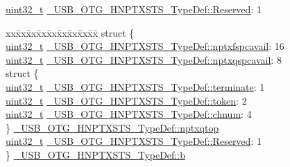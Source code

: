 \begin{DoxyCompactItemize}
\begin{tabbing}
\end{tabbing}\item 
\hyperlink{stdint_8h_a435d1572bf3f880d55459d9805097f62}{uint32\-\_\-t} \hyperlink{group___u_s_b___o_t_g___d_r_i_v_e_r_ga0b02a3404c6ad41176f49181c017ca7c}{\-\_\-\-U\-S\-B\-\_\-\-O\-T\-G\-\_\-\-H\-N\-P\-T\-X\-S\-T\-S\-\_\-\-Type\-Def\-::\-Reserved}\-: 1
\item 
\begin{tabbing}
xx\=xx\=xx\=xx\=xx\=xx\=xx\=xx\=xx\=\kill
struct \{\\
\>\hyperlink{stdint_8h_a435d1572bf3f880d55459d9805097f62}{uint32\_t} \hyperlink{group___u_s_b___o_t_g___d_r_i_v_e_r_gac775d30f4d6ea8497522eea1c8f1dd99}{\_USB\_OTG\_HNPTXSTS\_TypeDef::nptxfspcavail}: 16\\
\>\hyperlink{stdint_8h_a435d1572bf3f880d55459d9805097f62}{uint32\_t} \hyperlink{group___u_s_b___o_t_g___d_r_i_v_e_r_gac7c8e3ec8eb043384cd26aaf67009f46}{\_USB\_OTG\_HNPTXSTS\_TypeDef::nptxqspcavail}: 8\\
\>struct \{\\
\>\>\hyperlink{stdint_8h_a435d1572bf3f880d55459d9805097f62}{uint32\_t} \hyperlink{group___u_s_b___o_t_g___d_r_i_v_e_r_ga15d8c9921780fc2eabe7052d5aa94ca1}{\_USB\_OTG\_HNPTXSTS\_TypeDef::terminate}: 1\\
\>\>\hyperlink{stdint_8h_a435d1572bf3f880d55459d9805097f62}{uint32\_t} \hyperlink{group___u_s_b___o_t_g___d_r_i_v_e_r_gae107b5535ca75e09689f2e18a7f0a7d9}{\_USB\_OTG\_HNPTXSTS\_TypeDef::token}: 2\\
\>\>\hyperlink{stdint_8h_a435d1572bf3f880d55459d9805097f62}{uint32\_t} \hyperlink{group___u_s_b___o_t_g___d_r_i_v_e_r_gaa358189a93a955a21e5b3cfdb0b1a08d}{\_USB\_OTG\_HNPTXSTS\_TypeDef::chnum}: 4\\
\>\} \hyperlink{group___u_s_b___o_t_g___d_r_i_v_e_r_gac60267dff234320797a8a09809cc7b43}{\_USB\_OTG\_HNPTXSTS\_TypeDef::nptxqtop}\\
\>\hyperlink{stdint_8h_a435d1572bf3f880d55459d9805097f62}{uint32\_t} \hyperlink{group___u_s_b___o_t_g___d_r_i_v_e_r_ga0b02a3404c6ad41176f49181c017ca7c}{\_USB\_OTG\_HNPTXSTS\_TypeDef::Reserved}: 1\\
\} \hyperlink{group___u_s_b___o_t_g___d_r_i_v_e_r_ga93b03184bf8fd8e9db0d50ef51e02aa3}{\_USB\_OTG\_HNPTXSTS\_TypeDef::b}\\


\end{tabbing}
\end{DoxyCompactItemize}
